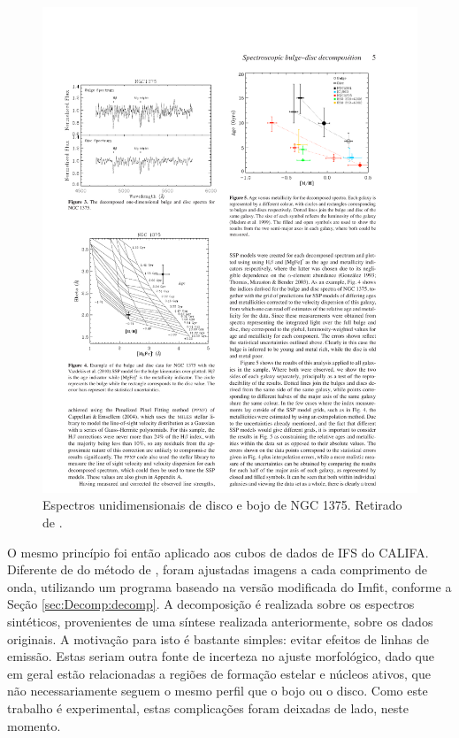 \begin{figure}
	\includegraphics{figuras/johnston-spectra}
	\caption[Espectros das componentes morfológicas] {Espectros unidimensionais de
	disco e bojo de NGC 1375. Retirado de \citet{Johnston2012}.}
	\label{fig:spectraJohnston}
\end{figure}

O mesmo princípio foi então aplicado aos cubos de dados de IFS do CALIFA.
Diferente de do método de \citeauthor{Johnston2012}, foram ajustadas imagens a
cada comprimento de onda, utilizando um programa baseado na versão modificada do
Imfit, conforme a Seção \ref{sec:Decomp:decomp}. A decomposição é realizada
sobre os espectros sintéticos, provenientes de uma síntese realizada
anteriormente, sobre os dados originais. A motivação para isto é bastante
simples: evitar efeitos de linhas de emissão.
Estas seriam outra fonte de incerteza no ajuste morfológico, dado que em geral
estão relacionadas a regiões de formação estelar e núcleos ativos, que não
necessariamente seguem o mesmo perfil que o bojo ou o disco. Como este trabalho
é experimental, estas complicações foram deixadas de lado, neste momento.


